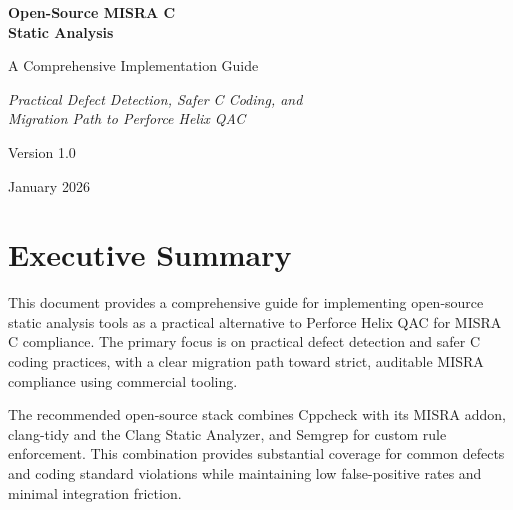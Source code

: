 \documentclass[11pt,letterpaper]{report}
\begin{document}
\begin{titlepage}
    \centering
    \vspace*{2cm}

    {\Huge\bfseries\color{headerblue} Open-Source MISRA C\\[0.3cm] Static Analysis\par}

    \vspace{1cm}

    {\LARGE\color{accentblue} A Comprehensive Implementation Guide\par}

    \vspace{1.5cm}

    {\large\itshape Practical Defect Detection, Safer C Coding, and\\Migration Path to Perforce Helix QAC\par}

    \vfill

    {\large Version 1.0\par}
    {\large January 2026\par}

    \vspace{2cm}
\end{titlepage}

\tableofcontents
\newpage

\chapter{Executive Summary}

This document provides a comprehensive guide for implementing open-source static analysis tools as a practical alternative to Perforce Helix QAC for MISRA C compliance. The primary focus is on practical defect detection and safer C coding practices, with a clear migration path toward strict, auditable MISRA compliance using commercial tooling.

The recommended open-source stack combines Cppcheck with its MISRA addon, clang-tidy and the Clang Static Analyzer, and Semgrep for custom rule enforcement. This combination provides substantial coverage for common defects and coding standard violations while maintaining low false-positive rates and minimal integration friction.
\end{document}
